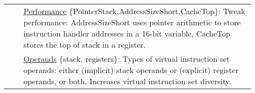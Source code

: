 \begin{table*}[!hp]
\begin{tabular}{|p{2.25cm}|p{4cm}|p{11cm}|}
                                     &                                                                                                                                                                                                                                                                                                         & \underline{Performance} \{PointerStack,AddressSizeShort,CacheTop\}: Tweak performance:  AddressSizeShort uses pointer arithmetic to store instruction handler addresses in a 16-bit variable, CacheTop stores the top of stack in a register.                                                                  \\ \cline{3-3} 
                                     &                                                                                                                                                                                                                                                                                                         & \underline{Operands} \{stack, registers\}: Types of virtual instruction set operands: either (implicit) stack operands or (explicit) register operands, or both. Increases virtual instruction set diversity.                                                                                                                                                                                               \\ \hline
\end{tabular}
\end{table*}